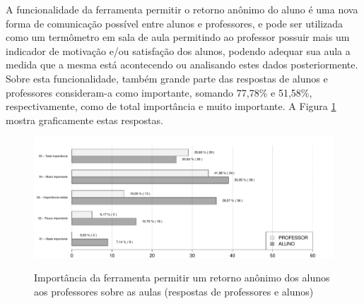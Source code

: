 A funcionalidade da ferramenta permitir o retorno anônimo do aluno é uma nova forma de comunicação possível entre alunos e professores, e pode ser utilizada como um termômetro em sala de aula permitindo ao professor possuir mais um indicador de motivação e/ou satisfação dos alunos, podendo adequar sua aula a medida que a mesma está acontecendo ou analisando estes dados posteriormente. Sobre esta funcionalidade, também grande parte das respostas de alunos e professores consideram-a como importante, somando 77,78\% e 51,58\%, respectivamente, como de total importância e muito importante. A Figura \ref{fig:grafico_retorno} mostra graficamente estas respostas.

\begin{figure}[!h]
\centering
\caption{Importância da ferramenta permitir um retorno anônimo dos alunos aos professores sobre as aulas (respostas de professores e alunos)}
\includegraphics[width=1.0\textwidth]{pdfs/alunos-professores/funcionalidades-retorno.pdf} 
\label{fig:grafico_retorno} 
\end{figure}







